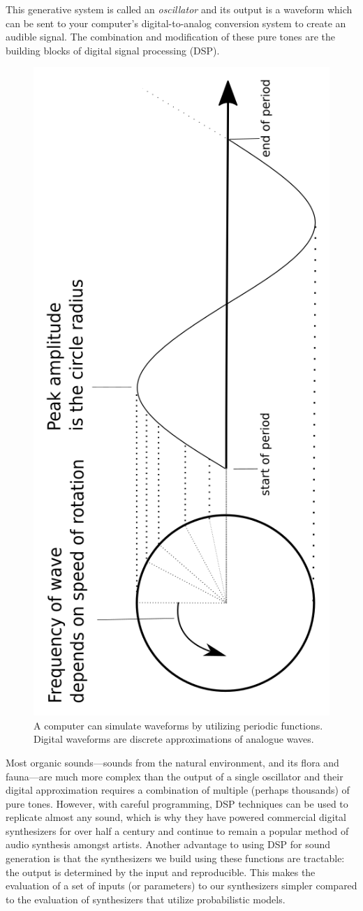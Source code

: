 \documentclass[\main/thesis.tex]{subfiles}
\begin{document}
This generative system is called an \textit{oscillator} and its output is a waveform which can be sent to your computer's digital-to-analog conversion system to create an audible signal. The combination and modification of these pure tones are the building blocks of digital signal processing (DSP).
\begin{figure}[h]
\centering
\includegraphics[width=0.45\linewidth,angle =-90 ]{images/periodic_function.png}
\caption{A computer can simulate waveforms by utilizing periodic functions. Digital waveforms are discrete approximations of analogue waves. }
\end{figure}


 Most organic sounds---sounds from the natural environment, and its flora and fauna---are much more complex than the output of a single oscillator and their digital approximation requires a combination of multiple (perhaps thousands) of pure tones. However, with careful programming, DSP techniques can be used to replicate almost any sound, which is why they have powered commercial digital synthesizers for over half a century \cite{jenkins2019analog} and continue to remain a popular method of audio synthesis amongst artists. Another advantage to using DSP for sound generation is that the synthesizers we build using these functions are tractable: the output is determined by the input and reproducible. This makes the evaluation of a set of inputs (or parameters) to our synthesizers  simpler compared to the evaluation of synthesizers that utilize probabilistic models.
 
\end{document}

